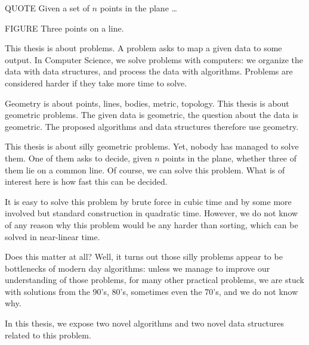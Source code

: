 
QUOTE Given a set of \(n\) points in the plane \dots

FIGURE Three points on a line.

This thesis is about problems. A problem asks to map a given data to some output.
In Computer Science, we solve problems with computers: we organize the data
with data structures, and process the data with algorithms.
%
Problems are considered harder if they take more time to solve.

Geometry is about points, lines, bodies, metric, topology.
%
This thesis is about geometric problems. The given data is geometric, the
question about the data is geometric. The proposed algorithms and data
structures therefore use geometry.

This thesis is about silly geometric problems. Yet, nobody has managed to
solve them. One of them asks to decide, given \(n\) points in the plane,
whether three of them lie on a common line. Of course, we can solve this
problem. What is of interest here is how fast this can be decided.

It is easy to solve this problem by brute force in cubic time and by some
more involved but standard construction in quadratic time. However, we do not
know of any reason why this problem would be any harder than sorting, which can
be solved in near-linear time.

Does this matter at all? Well, it turns out those silly problems appear to
be bottlenecks of modern day algorithms: unless we manage to improve our
understanding of those problems, for many other practical problems,
we are stuck with solutions from the 90's, 80's, sometimes even the 70's, and
we do not know why.

In this thesis, we expose two novel algorithms and two novel data
structures related to this problem.
